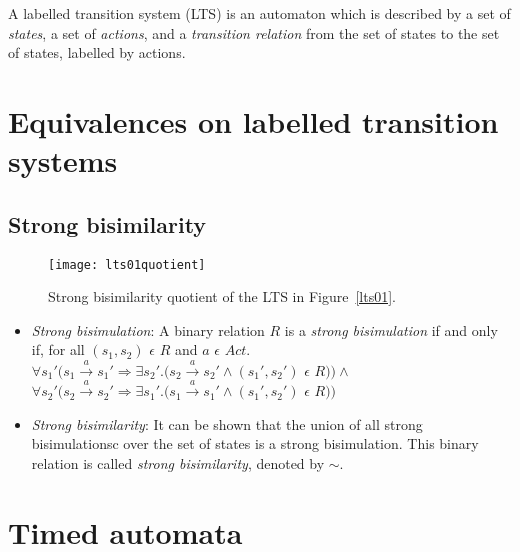 \documentclass{article}
\begin{document}
A labelled transition system (LTS) \cite{aceto2007reactive} is an automaton
which is described by a set of \emph{states}, a set of \emph{actions},
and a \emph{transition relation} from the set of states to the set of
states, labelled by actions. \\

\section{Equivalences on labelled transition systems}

\subsection{Strong bisimilarity}

\begin{SCfigure}
  \centering
  \texttt{[image: lts01quotient]}
  \caption{Strong bisimilarity quotient of the LTS in Figure~\ref{lts01}.}
\end{SCfigure}

\begin{itemize}
\item \emph{Strong bisimulation}: A binary relation $R$ is a \textit{strong
  bisimulation} if and only if, for all $(s_1, s_2)$ $\epsilon$ $R$ and $a$ $\epsilon$ $Act .$\\
  $\forall s_1' (s_1 \xrightarrow{a} s_1' \Rightarrow \exists s_2'
  . (s_2 \xrightarrow{a} s_2' \wedge (s_1', s_2')$ $\epsilon$ $R ) )
  \wedge $ \\
  $\forall s_2' (s_2 \xrightarrow{a} s_2' \Rightarrow \exists s_1'
  . (s_1 \xrightarrow{a} s_1' \wedge (s_1', s_2')$ $\epsilon$ $R ) )$
\item \emph{Strong bisimilarity}: It can be shown that the union of
  all strong bisimulationsc over the set of states is a strong
  bisimulation. This binary relation is called \textit{strong
    bisimilarity}, denoted by $\sim$.

\end{itemize}

\section{Timed automata}
\end{document}
